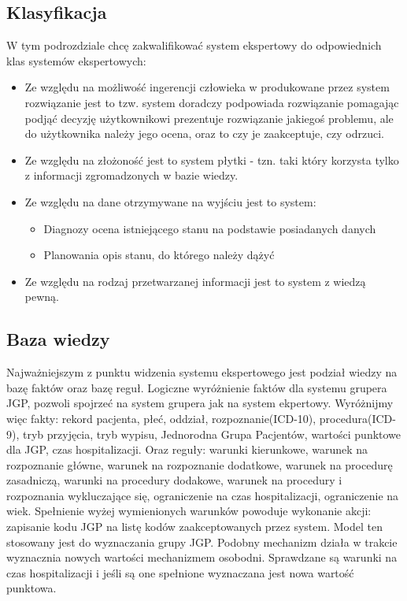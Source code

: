 \subsection{Klasyfikacja}
\label{sec:klasyfikacjaSystemuEkspertowego}
W tym podrozdziale chcę zakwalifikować system ekspertowy do odpowiednich klas systemów ekspertowych:
\begin{itemize}
 \item Ze względu na możliwość ingerencji człowieka w produkowane przez system rozwiązanie jest to tzw. system doradczy \textendash{} podpowiada rozwiązanie pomagając podjąć decyzję użytkownikowi \textendash{} prezentuje rozwiązanie jakiegoś problemu, ale do użytkownika należy jego ocena, oraz to czy je zaakceptuje, czy odrzuci.
 \item Ze względu na złożoność jest to system płytki - tzn. taki który korzysta tylko z informacji zgromadzonych w bazie wiedzy.
 \item Ze względu na dane otrzymywane na wyjściu jest to system:
   \begin{itemize}
    \item Diagnozy \textendash{} ocena istniejącego stanu na podstawie posiadanych danych
    \item Planowania \textendash{} opis stanu, do którego należy dążyć
   \end{itemize}
 \item Ze względu na rodzaj przetwarzanej informacji jest to system z wiedzą pewną.
\end{itemize}

\subsection{Baza wiedzy}
\label{sec:bazaWiedzy}
Najważniejszym z punktu widzenia systemu ekspertowego jest podział wiedzy na bazę faktów oraz bazę reguł. Logiczne wyróżnienie faktów dla systemu grupera JGP, pozwoli spojrzeć na system grupera jak na system ekpertowy. Wyróżnijmy więc fakty: rekord pacjenta, płeć, oddział, rozpoznanie(ICD-10), procedura(ICD-9), tryb przyjęcia, tryb wypisu, Jednorodna Grupa Pacjentów, wartości punktowe dla JGP, czas hospitalizacji. Oraz reguły: warunki kierunkowe, warunek na rozpoznanie główne, warunek na rozpoznanie dodatkowe, warunek na procedurę zasadniczą, warunki na procedury dodakowe, warunek na procedury i rozpoznania wykluczające się, ograniczenie na czas hospitalizacji, ograniczenie na wiek.
Spełnienie wyżej wymienionych warunków powoduje wykonanie akcji: zapisanie kodu JGP na listę kodów zaakceptowanych przez system. Model ten stosowany jest do wyznaczania grupy JGP.
Podobny mechanizm działa w trakcie wyznacznia nowych wartości mechanizmem osobodni.
Sprawdzane są warunki na czas hospitalizacji i jeśli są one spełnione wyznaczana jest nowa wartość punktowa.

